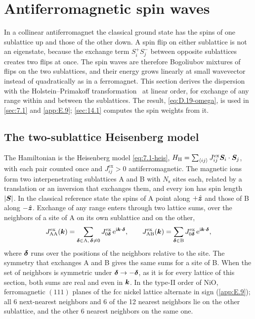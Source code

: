 \section{Antiferromagnetic spin waves}\label{app:D.19}

In a collinear antiferromagnet the classical ground state has the spins of one sublattice up and those of the other down. A spin flip on either sublattice is not an eigenstate, because the exchange term $S^+_iS^-_j$ between opposite sublattices creates two flips at once. The spin waves are therefore Bogoliubov mixtures of flips on the two sublattices, and their energy grows linearly at small wavevector instead of quadratically as in a ferromagnet. This section derives the dispersion with the Holstein--Primakoff transformation~\cite{holstein1940field} at linear order, for exchange of any range within and between the sublattices. The result, \cref{eq:D.19-omega}, is used in \cref{sec:7.1} and \cref{app:E.9}; \cref{sec:14.1} computes the spin weights from it.

\subsection*{The two-sublattice Heisenberg model}

The Hamiltonian is the Heisenberg model \cref{eq:7.1-heis}, $H_{\mathrm{H}} = \sum_{\langle ij\rangle}J^{\mathrm{ex}}_{ij}\bm{S}_i\cdot\bm{S}_j$, with each pair counted once and $J^{\mathrm{ex}}_{ij} > 0$ antiferromagnetic. The magnetic ions form two interpenetrating sublattices A and B with $N_{\mathrm{s}}$ sites each, related by a translation or an inversion that exchanges them, and every ion has spin length $|\bm{S}|$. In the classical reference state the spins of A point along $+\hat{\bm{z}}$ and those of B along $-\hat{\bm{z}}$. Exchange of any range enters through two lattice sums, over the neighbors of a site of A on its own sublattice and on the other,
\begin{equation}
  J^{\mathrm{ex}}_{\mathrm{AA}}(\bm{k}) = \sum_{\bm{\delta}\in\mathrm{A},\,\bm{\delta}\ne0}J^{\mathrm{ex}}_{0\bm{\delta}}\,\mathrm{e}^{\mathrm{i}\bm{k}\cdot\bm{\delta}}, \qquad
  J^{\mathrm{ex}}_{\mathrm{AB}}(\bm{k}) = \sum_{\bm{\delta}\in\mathrm{B}}J^{\mathrm{ex}}_{0\bm{\delta}}\,\mathrm{e}^{\mathrm{i}\bm{k}\cdot\bm{\delta}} ,
  \label{eq:D.19-Jk}
\end{equation}
where $\bm{\delta}$ runs over the positions of the neighbors relative to the site. The symmetry that exchanges A and B gives the same sums for a site of B. When the set of neighbors is symmetric under $\bm{\delta} \to -\bm{\delta}$, as it is for every lattice of this section, both sums are real and even in $\bm{k}$. In the type-II order of NiO, ferromagnetic $(111)$ planes of the fcc nickel lattice alternate in sign (\cref{app:E.9}); all 6 next-nearest neighbors and 6 of the 12 nearest neighbors lie on the other sublattice, and the other 6 nearest neighbors on the same one.

